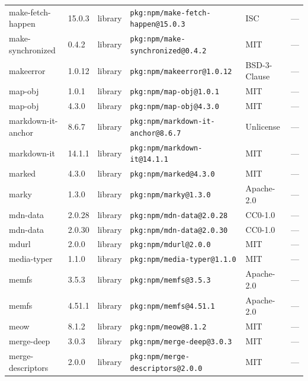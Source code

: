 \documentclass[11pt,a4paper]{article}
\begin{document}
\begin{longtable}{|p{4cm}|p{2cm}|p{1.6cm}|p{5cm}|p{1.5cm}|p{3.5cm}|}
\raggedright make-fetch-happen & 15.0.3 & library & \small\texttt{pkg:npm/make-fetch-happen@15.0.3} & ISC & \small — \\
\raggedright make-synchronized & 0.4.2 & library & \small\texttt{pkg:npm/make-synchronized@0.4.2} & MIT & \small — \\
\raggedright makeerror & 1.0.12 & library & \small\texttt{pkg:npm/makeerror@1.0.12} & BSD-3-Clause & \small — \\
\raggedright map-obj & 1.0.1 & library & \small\texttt{pkg:npm/map-obj@1.0.1} & MIT & \small — \\
\raggedright map-obj & 4.3.0 & library & \small\texttt{pkg:npm/map-obj@4.3.0} & MIT & \small — \\
\raggedright markdown-it-anchor & 8.6.7 & library & \small\texttt{pkg:npm/markdown-it-anchor@8.6.7} & Unlicense & \small — \\
\raggedright markdown-it & 14.1.1 & library & \small\texttt{pkg:npm/markdown-it@14.1.1} & MIT & \small — \\
\raggedright marked & 4.3.0 & library & \small\texttt{pkg:npm/marked@4.3.0} & MIT & \small — \\
\raggedright marky & 1.3.0 & library & \small\texttt{pkg:npm/marky@1.3.0} & Apache-2.0 & \small — \\
\raggedright mdn-data & 2.0.28 & library & \small\texttt{pkg:npm/mdn-data@2.0.28} & CC0-1.0 & \small — \\
\raggedright mdn-data & 2.0.30 & library & \small\texttt{pkg:npm/mdn-data@2.0.30} & CC0-1.0 & \small — \\
\raggedright mdurl & 2.0.0 & library & \small\texttt{pkg:npm/mdurl@2.0.0} & MIT & \small — \\
\raggedright media-typer & 1.1.0 & library & \small\texttt{pkg:npm/media-typer@1.1.0} & MIT & \small — \\
\raggedright memfs & 3.5.3 & library & \small\texttt{pkg:npm/memfs@3.5.3} & Apache-2.0 & \small — \\
\raggedright memfs & 4.51.1 & library & \small\texttt{pkg:npm/memfs@4.51.1} & Apache-2.0 & \small — \\
\raggedright meow & 8.1.2 & library & \small\texttt{pkg:npm/meow@8.1.2} & MIT & \small — \\
\raggedright merge-deep & 3.0.3 & library & \small\texttt{pkg:npm/merge-deep@3.0.3} & MIT & \small — \\
\raggedright merge-descriptors & 2.0.0 & library & \small\texttt{pkg:npm/merge-descriptors@2.0.0} & MIT & \small — \\

\end{longtable}
\end{document}
